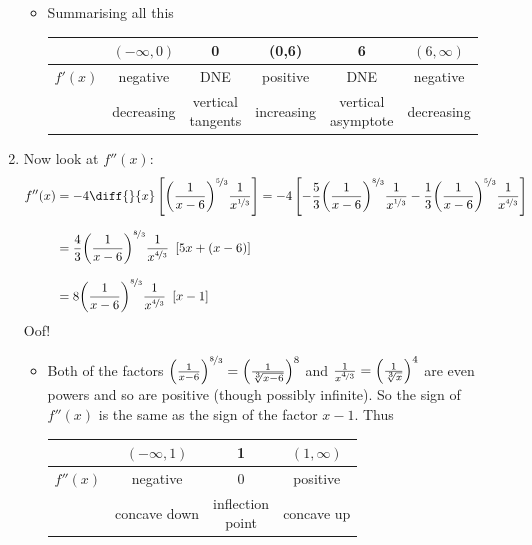 \begin{eg}[$f(x)=\root{3}\of{\frac{x^2}{(x-6)^2}}\ $]
\begin{enumerate}[(1)]
\begin{itemize}
\item Summarising all this
\begin{center}
 \begin{tabular}{|c|c||c||c||c||c|}
\hline
  & $(-\infty,0)$ & 0 & (0,6) & 6 & $(6,\infty)$\\
\hline
$f'(x)$  & negative & DNE & positive & DNE & negative \\
\hline
 & decreasing & \parbox{2cm}{\centering vertical\\tangents} &
increasing &
\parbox{2cm}{\centering vertical\\asymptote} & decreasing \\
\hline
 \end{tabular}
\end{center}

\end{itemize}


\item Now look at $f''(x)$:
\begin{align*}
f''(x)&=-4\diff{}{x}
    \left[{\left(\frac{1}{x-6}\right)}^{\nicefrac{5}{3}}
           \frac{1}{x^{\nicefrac{1}{3}}} \right]
=-4 \left[-\frac{5}{3}{\left(\frac{1}{x-6}\right)}^{\nicefrac{8}{3}}
           \frac{1}{x^{\nicefrac{1}{3}}}
         -\frac{1}{3} {\left(\frac{1}{x-6}\right)}^{\nicefrac{5}{3}}
           \frac{1}{x^{\nicefrac{4}{3}}}\right] \\[0.1in]
&=\frac{4}{3} {\left(\frac{1}{x-6}\right)}^{\nicefrac{8}{3}}
            \frac{1}{x^{\nicefrac{4}{3}}}\ \left[5x +(x-6)\right] \\[0.1in]
&=8 {\left(\frac{1}{x-6}\right)}^{\nicefrac{8}{3}}
            \frac{1}{x^{\nicefrac{4}{3}}}\ \left[x-1\right]
\end{align*}
Oof!
\begin{itemize}
 \item Both of the factors
         ${\Big(\frac{1}{x-6}\Big)}^{\nicefrac{8}{3}}
          ={\Big(\frac{1}{\root{3}\of{x-6}}\Big)}^8$ and
            $\frac{1}{x^{\nicefrac{4}{3}}}
             =\Big(\frac{1}{\root{3}\of{x}}\Big)^4$ are even powers
and so are positive (though possibly infinite). So the sign of $f''(x)$
is the same as the sign of the factor $x-1$. Thus
\begin{center}
 \begin{tabular}{|c|c||c||c|}
\hline
  & $(-\infty,1)$ & 1 & $(1,\infty)$\\
\hline
$f''(x)$  & negative & 0 & positive  \\
\hline
 & concave down & \parbox{2cm}{\centering inflection\\point} &
concave up \\
\hline
 \end{tabular}
\end{center}
\end{itemize}
\end{enumerate}


\end{eg}
